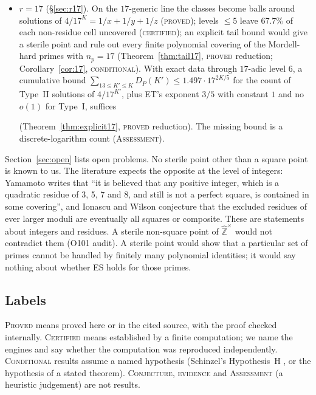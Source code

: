 \documentclass[11pt,reqno]{amsart}
\theoremstyle{definition}
\newcommand{\Z}{\mathbb Z}
\newcommand{\Zhu}{\widehat{\Z}^{\times}}
\newcommand{\status}[1]{\textup{\textsc{#1}}}
\begin{document}
\begin{itemize}
and outside $35459$ explicit subclasses of measure $8.42\cdot10^{-5}$ of
those six (Theorem~\ref{thm:tree13}, three independent checkers); no
class closes completely.  The point $x^*$ with $x^*_{11}=x^*_{13}=2$ lies in no ET class of modulus
$\le10^6$ (\status{certified}).  It is nevertheless not sterile: it
lies in an explicit II3 class of modulus $12670944$
(Proposition~\ref{prop:xstarcovered}, \status{proved}).  This refutes an
earlier conjecture.  The point $x^{**}$ with $(x^{**}_{11},x^{**}_{13})=(2,15)$
survives targeted searches far beyond that height (\status{certified}
within stated ranges); that it is sterile is a conjecture supported only
by this evidence.
\item \emph{$r=17$} (\S\ref{sec:r17}).  On the $17$-generic line the
classes become balls around solutions of $4/17^K=1/x+1/y+1/z$
(\status{proved}); levels $\le5$ leave $67.7\%$ of each non-residue cell
uncovered (\status{certified}); an explicit tail bound would give a sterile
point and rule out every finite polynomial covering of the Mordell-hard
primes with $n_p=17$ (Theorem~\ref{thm:tail17}, \status{proved}
reduction; Corollary~\ref{cor:17}, \status{conditional}).  With exact
data through $17$-adic level $6$, a cumulative bound
$\sum_{13\le K'\le K}D_P(K')\le1.497\cdot17^{2K/5}$ for the count of
Type~II solutions of $4/17^{K'}$, plus ET's exponent $3/5$ with
constant $1$ and no $o(1)$ for Type~I, suffices%

(Theorem~\ref{thm:explicit17}, \status{proved} reduction).  The missing
bound is a discrete-logarithm count (\status{Assessment}).
\end{itemize}
Section~\ref{sec:open} lists open problems.  No sterile point other than
a square point is known to us.  The literature expects the opposite at
the level of integers: Yamamoto \cite[p.~47]{Yamamoto} writes that ``it
is believed that any positive integer, which is a quadratic residue of
3, 5, 7 and 8, and still is not a perfect square, is contained in some
covering'', and Ionascu and Wilson \cite{IW} conjecture that the excluded
residues of ever larger moduli are eventually all squares or composite.
These are statements about integers and residues.  A sterile non-square
point of $\Zhu$ would not contradict them (O101 audit).  A sterile point would show that a particular
set of primes cannot be handled by finitely many polynomial identities;
it would say nothing about whether ES holds for those primes.

\subsection*{Labels}
\status{Proved} means proved here or in the cited source, with the proof
checked internally.  \status{Certified} means established by a finite
computation; we name the engines and say whether the computation was
reproduced independently.  \status{Conditional} results assume a named
hypothesis (Schinzel's Hypothesis~H \cite{SS}, or the hypothesis of a
stated theorem).  \status{Conjecture}, \status{evidence} and
\status{Assessment} (a heuristic judgement) are not results.
\end{document}
